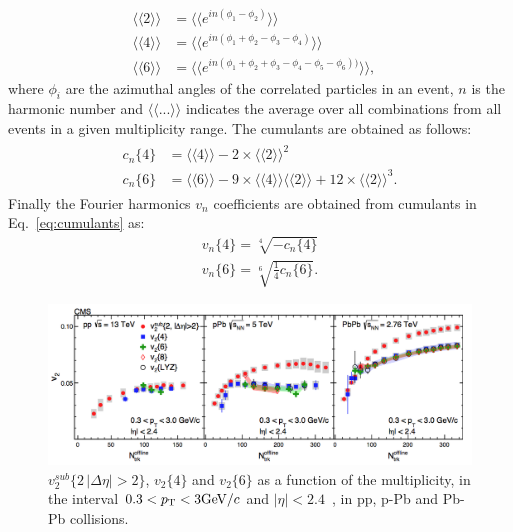\begin{equation}
\label{correlations}
\begin{aligned}
\langle \langle 2 \rangle \rangle &= \langle \langle e^{in(\phi_1 -\phi_2)} \rangle \rangle &\\
\langle \langle 4 \rangle \rangle &= \langle \langle e^{in(\phi_1 + \phi_2 -\phi_3 - \phi_4)} \rangle \rangle &\\
\langle \langle 6 \rangle \rangle &= \langle \langle e^{in(\phi_1 + \phi_2 +\phi_3 - \phi_4- \phi_5- \phi_6))} \rangle \rangle,&
\end{aligned}
\end{equation}
where $\phi_i$ are the azimuthal angles of the correlated particles in an event, $n$ is the harmonic number and $\langle \langle ... \rangle \rangle$ indicates the average over all combinations from all events in a given multiplicity range. The cumulants are obtained as follows:
\begin{equation}
\label{eq:cumulants}
\begin{aligned}
\begin{split}
c_n\{4\} &= \langle \langle 4 \rangle \rangle - 2 \times  \langle \langle 2 \rangle \rangle^2 \\
c_n\{6\} &= \langle \langle 6 \rangle \rangle - 9 \times  \langle \langle 4 \rangle \rangle \langle \langle 2 \rangle \rangle + 12 \times \langle \langle 2 \rangle \rangle^3.
\end{split}
\end{aligned}
\end{equation}
Finally the Fourier harmonics $v_n$ coefficients are obtained from cumulants in Eq.~\ref{eq:cumulants} as:
\begin{equation}
\begin{aligned}
v_n \{4\} = \sqrt[4]{-c_n\{4\}} \\
v_n \{6\} = \sqrt[6]{\frac{1}{4}c_n\{6\}}.
\end{aligned}
\end{equation}
\begin{figure}[!ht]
  \centering
  \includegraphics[width=15cm]{FigCap1/v2CumulantsCMS.png}
  \caption{$v_2^{sub} \{2\, |\Delta \eta| > 2\}$, $v_2 \{4\}$ and $v_2 \{6\}$  as a function of the multiplicity, in the interval $0.3 < p_{\rm T} < 3 \mathrm{GeV}/c$ and $|\eta| < 2.4$~\cite{Khachatryan:2016txc}, in pp, p-Pb and Pb-Pb collisions.}
  \label{fig:CumulantsCMS}
\end{figure}
